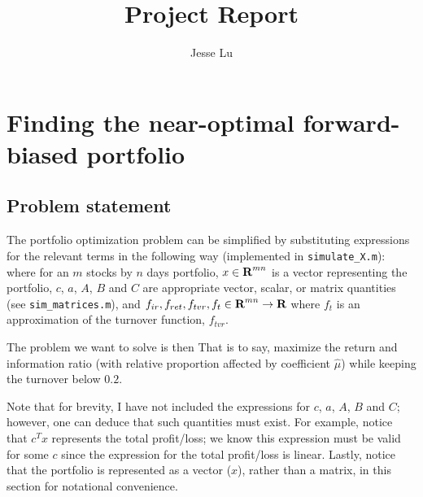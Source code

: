 \documentclass{article}
\title{Project Report}
\author{Jesse Lu}
\begin{document}
\maketitle

\section{Finding the near-optimal forward-biased portfolio}

\subsection{Problem statement}
    The portfolio optimization problem can be simplified 
        by substituting expressions for the relevant terms in the following way
        (implemented in \verb+simulate_X.m+):
    where for an $m$ stocks by $n$ days portfolio,
        \BI $x \in {\mbox{\bf R}}^{mn}$ is a vector representing the portfolio,
        \I  $c$, $a$, $A$, $B$ and $C$ are appropriate vector, scalar, 
            or matrix quantities (see \verb+sim_matrices.m+), and
        \I  $f_{ir}, f_{ret}, f_{tvr}, f_{t} \in {\mbox{\bf R}}^{mn} \to {\mbox{\bf R}}$
            where $f_{t}$ is an approximation of the turnover function, 
            $f_{tvr}$. \EI

    The problem we want to solve is then
    That is to say, maximize the return and information ratio
        (with relative proportion affected by coefficient $\hat{\mu}$)
        while keeping the turnover below $0.2$.


    Note that for brevity, I have not included the expressions for 
        $c$, $a$, $A$, $B$ and $C$; 
        however, one can deduce that such quantities must exist.
    For example, notice that $c^T x$ represents the total profit/loss;
        we know this expression must be valid for some $c$ 
        since the expression for the total profit/loss is linear.
    Lastly, notice that the portfolio is represented as a vector ($x$),
        rather than a matrix, in this section for notational convenience.
\end{document}
